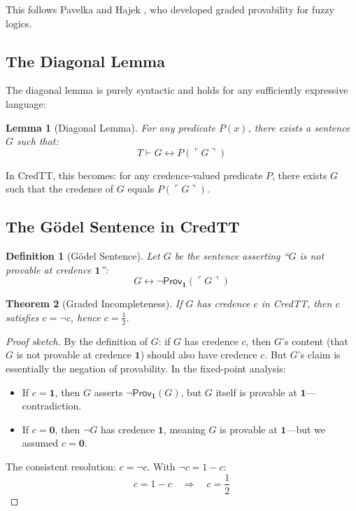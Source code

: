 \documentclass[11pt,a4paper]{article}
\newtheorem{definition}{Definition}[section]
\newtheorem{theorem}{Theorem}[section]
\newtheorem{lemma}[theorem]{Lemma}
\newcommand{\one}{\mathbf{1}}
\newcommand{\zero}{\mathbf{0}}
\newcommand{\negc}{\neg}
\begin{document}
This follows Pavelka \citep{pavelka1979fuzzy} and Hajek \citep{hajek1998metamathematics}, who developed graded provability for fuzzy logics.

\subsection{The Diagonal Lemma}

The diagonal lemma is purely syntactic and holds for any sufficiently expressive language:

\begin{lemma}[Diagonal Lemma]
For any predicate $P(x)$, there exists a sentence $G$ such that:
\[
T \vdash G \leftrightarrow P(\ulcorner G \urcorner)
\]
\end{lemma}

In CredTT, this becomes: for any credence-valued predicate $P$, there exists $G$ such that the credence of $G$ equals $P(\ulcorner G \urcorner)$.

\subsection{The G\"odel Sentence in CredTT}

\begin{definition}[G\"odel Sentence]
Let $G$ be the sentence asserting ``$G$ is not provable at credence $\one$'':
\[
G \leftrightarrow \neg \mathsf{Prov}_\one(\ulcorner G \urcorner)
\]
\end{definition}

\begin{theorem}[Graded Incompleteness]\label{thm:graded-incompleteness}
If $G$ has credence $c$ in CredTT, then $c$ satisfies $c = \negc c$, hence $c = \frac{1}{2}$.
\end{theorem}

\begin{proof}[Proof sketch]
By the definition of $G$: if $G$ has credence $c$, then $G$'s content (that $G$ is not provable at credence $\one$) should also have credence $c$. But $G$'s claim is essentially the negation of provability. In the fixed-point analysis:
\begin{itemize}
    \item If $c = \one$, then $G$ asserts $\neg\mathsf{Prov}_\one(G)$, but $G$ itself is provable at $\one$---contradiction.
    \item If $c = \zero$, then $\neg G$ has credence $\one$, meaning $G$ is provable at $\one$---but we assumed $c = \zero$.
\end{itemize}
The consistent resolution: $c = \negc c$. With $\negc c = 1 - c$:
\[
c = 1 - c \quad \Rightarrow \quad c = \frac{1}{2}
\]
\end{proof}
\end{document}
